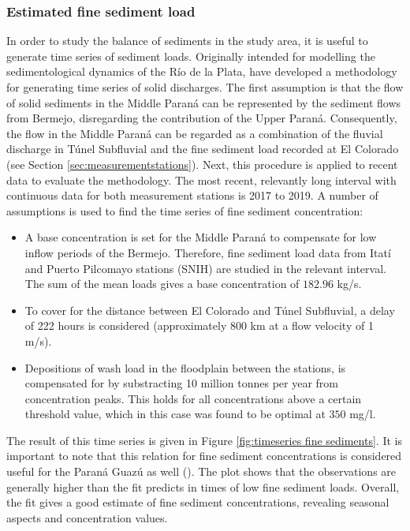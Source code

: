 \subsubsection{Estimated fine sediment load}
In order to study the balance of sediments in the study area, it is useful to generate time series of sediment loads. Originally intended for modelling the sedimentological dynamics of the Río de la Plata, \citeauthor{reMETODOLOGIAPARAGENERACION2009} have developed a methodology for generating time series of solid discharges. The first assumption is that the flow of solid sediments in the Middle Paraná can be represented by the sediment flows from Bermejo, disregarding the contribution of the Upper Paraná. Consequently, the flow in the Middle Paraná can be regarded as a combination of the fluvial discharge in Túnel Subfluvial and the fine sediment load recorded at El Colorado (see Section \ref{sec:measurementstations}). Next, this procedure is applied to recent data to evaluate the methodology. The most recent, relevantly long interval with continuous data for both measurement stations is 2017 to 2019. A number of assumptions is used to find the time series of fine sediment concentration:

\begin{itemize}
    \item A base concentration is set for the Middle Paraná to compensate for low inflow periods of the Bermejo. Therefore, fine sediment load data from Itatí and Puerto Pilcomayo stations (SNIH) are studied in the relevant interval. The sum of the mean loads gives a base concentration of $182.96$ kg/s.
    \item To cover for the distance between El Colorado and Túnel Subfluvial, a delay of 222 hours is considered (approximately 800 km at a flow velocity of 1 m/s). 
    \item Depositions of wash load in the floodplain between the stations, is compensated for by substracting 10 million tonnes per year from concentration peaks. This holds for all concentrations above a certain threshold value, which in this case was found to be optimal at $350$ mg/l.
\end{itemize}

The result of this time series is given in Figure \ref{fig:timeseries fine sediments}. It is important to note that this relation for fine sediment concentrations is considered useful for the Paraná Guazú as well (\cite{reMETODOLOGIAPARAGENERACION2009}). The plot shows that the observations are generally higher than the fit predicts in times of low fine sediment loads. Overall, the fit gives a good estimate of fine sediment concentrations, revealing seasonal aspects and concentration values.

